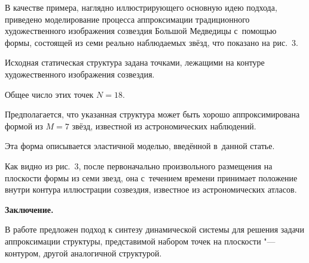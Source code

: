 В качестве примера, наглядно иллюстрирующего основную идею подхода, приведено моделирование процесса аппроксимации традиционного художественного изображения созвездия Большой Медведицы с~помощью формы, состоящей из семи реально наблюдаемых звёзд, что показано на рис.~3.

Исходная статическая структура задана точками, лежащими на контуре художественного изображения созвездия.

Общее число этих точек $N=18$.

Предполагается, что указанная структура может быть хорошо аппроксимирована формой из $M=7$ звёзд, известной из астрономических наблюдений.

Эта форма описывается эластичной моделью, введённой в~данной статье.

Как видно из рис.~3, после первоначально произвольного размещения на плоскости формы из семи звезд, она с~течением времени принимает положение внутри контура иллюстрации созвездия, известное из астрономических атласов.







%





%

%

%


%





\textbf{Заключение.}

 В работе предложен подход к синтезу динамической системы для решения задачи аппроксимации структуры, представимой набором точек на плоскости "--- контуром, другой аналогичной структурой.


